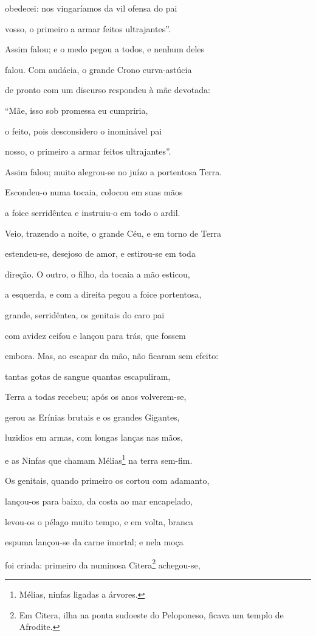 \begin{pages}
\begin{Rightside}
obedecei: nos vingaríamos da vil ofensa do pai 

vosso, o primeiro a armar feitos ultrajantes''.

\quad{}Assim falou; e o medo pegou a todos, e nenhum deles

falou. Com audácia, o grande Crono curva-astúcia

de pronto com um discurso respondeu à mãe devotada:

``Mãe, isso sob promessa eu cumpriria, 

o feito, pois desconsidero o inominável pai

nosso, o primeiro a armar feitos ultrajantes''.

\quad{}Assim falou; muito alegrou-se no juízo a portentosa Terra.

Escondeu-o numa tocaia, colocou em suas mãos

a foice serridêntea e instruiu-o em todo o ardil. 

Veio, trazendo a noite, o grande Céu, e em torno de Terra

estendeu-se, desejoso de amor, e estirou-se em toda

direção. O outro, o filho, da tocaia a mão esticou,

a esquerda, e com a direita pegou a foice portentosa,

grande, serridêntea, os genitais do caro pai 

com avidez ceifou e lançou para trás, que fossem

embora. Mas, ao escapar da mão, não ficaram sem efeito:

tantas gotas de sangue quantas escapuliram,

Terra a todas recebeu; após os anos volverem-se,

gerou as Erínias brutais e os grandes Gigantes, 

luzidios em armas, com longas lanças nas mãos,

e as Ninfas que chamam Mélias\footnote{Mélias, ninfas ligadas a árvores.} na terra sem-fim.

Os genitais, quando primeiro os cortou com adamanto,

lançou-os para baixo, da costa ao mar encapelado,

levou-os o pélago muito tempo, e em volta, branca 

espuma lançou-se da carne imortal; e nela moça

foi criada: primeiro da numinosa Citera\footnote{Em Citera, ilha na ponta sudoeste do Peloponeso, ficava um templo de Afrodite. } achegou-se,


\end{Rightside}
\end{pages}
